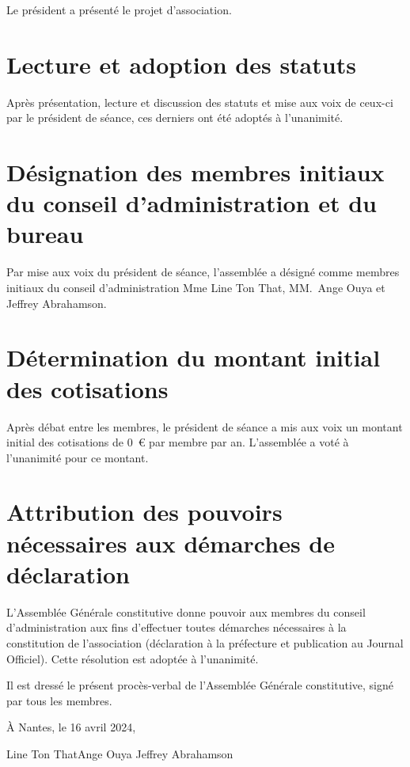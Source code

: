 \documentclass[12pt]{article}
\newcommand{\quand}{16 avril 2024}
\begin{document}
Le président a présenté le projet d'association.

\section{Lecture et adoption des statuts}
\label{sec:lecture-et-adoption-des-statuts}

Après présentation, lecture et discussion des statuts et mise aux voix
de ceux-ci par le président de séance, ces derniers ont été adoptés à
l'unanimité.

\section{Désignation des membres initiaux du conseil d'administration
  et du bureau}
\label{sec:designation-des-membres}

Par mise aux voix du président de séance, l'assemblée a désigné comme
membres initiaux du conseil d'administration Mme Line Ton That,
MM.~Ange Ouya et Jeffrey Abrahamson.

\section{Détermination du montant initial des cotisations}
\label{sec:determination-du-montant-initial-des-cotisations}

Après débat entre les membres, le président de séance a mis aux voix
un montant initial des cotisations de 0~\euro{} par membre par
an. L'assemblée a voté à l'unanimité pour ce montant.

\section{Attribution des pouvoirs nécessaires aux démarches de déclaration}
\label{sec:attribution-des-pouvoirs-necessaires-aux-demarches-de-declaration}

L'Assemblée Générale constitutive donne pouvoir aux membres du conseil
d'administration aux fins d'effectuer toutes démarches nécessaires à
la constitution de l'association (déclaration à la préfecture et
publication au Journal Officiel). Cette résolution est adoptée à
l'unanimité.

\vfill{}

Il est dressé le présent procès-verbal de l'Assemblée Générale
constitutive, signé par tous les membres.

\vspace{2cm}

\begin{flushright}
  À Nantes, le \quand{},
\end{flushright}

\vspace{2cm}

\hfill{}Line Ton That\hfill{}Ange Ouya \hspace{4cm} Jeffrey Abrahamson\hfill{}

\vfill
\end{document}
